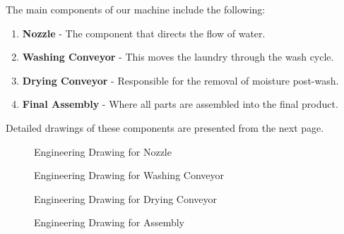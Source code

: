 \documentclass[12pt]{article} %
\begin{document}
The main components of our machine include the following:
\begin{enumerate}
    \item \textbf{Nozzle} - The component that directs the flow of water.
    \item \textbf{Washing Conveyor} - This moves the laundry through the wash cycle.
    \item \textbf{Drying Conveyor} - Responsible for the removal of moisture post-wash.
    \item \textbf{Final Assembly} - Where all parts are assembled into the final product.
\end{enumerate}
Detailed drawings of these components are presented from the next page.

\begin{figure}
    \centering

\caption{Engineering Drawing for Nozzle}
\end{figure}

\clearpage

\begin{figure}
    \centering

\caption{Engineering Drawing for Washing Conveyor}
\end{figure}

\clearpage

\begin{figure}
    \centering

\caption{Engineering Drawing for Drying Conveyor}
\end{figure}

\clearpage

\begin{figure}
    \centering

\caption{Engineering Drawing for Assembly}
\end{figure}

\clearpage

\begingroup
\let\oldthesection\thesection
\addtocounter{section}{+1}
\let\thesection\oldthesection 
\endgroup




\clearpage
\section*{}
\printglossary[type=\acronymtype]
\end{document}

